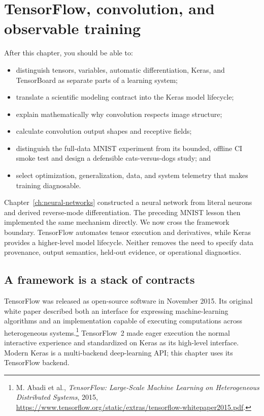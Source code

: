 \chapter{TensorFlow, convolution, and observable training}
\label{ch:tensorflow-convolution}

\begin{learningobjectives}
After this chapter, you should be able to:
\begin{itemize}
  \item distinguish tensors, variables, automatic differentiation, Keras, and
  TensorBoard as separate parts of a learning system;
  \item translate a scientific modeling contract into the Keras model
  lifecycle;
  \item explain mathematically why convolution respects image structure;
  \item calculate convolution output shapes and receptive fields;
  \item distinguish the full-data MNIST experiment from its bounded,
  offline CI smoke test and design a defensible cats-versus-dogs study; and
  \item select optimization, generalization, data, and system telemetry that
  makes training diagnosable.
\end{itemize}
\end{learningobjectives}

\begin{chapterconnection}
Chapter~\ref{ch:neural-networks} constructed a neural network from literal
neurons and derived reverse-mode differentiation. The preceding MNIST lesson
then implemented the same mechanism directly. We now cross the framework
boundary. TensorFlow automates tensor execution and derivatives, while Keras
provides a higher-level model lifecycle. Neither removes the need to specify
data provenance, output semantics, held-out evidence, or operational
diagnostics.
\end{chapterconnection}

\section{A framework is a stack of contracts}

TensorFlow was released as open-source software in November 2015. Its original
white paper described both an interface for expressing machine-learning
algorithms and an implementation capable of executing computations across
heterogeneous systems.\footnote{M. Abadi et al., \emph{TensorFlow: Large-Scale
Machine Learning on Heterogeneous Distributed Systems}, 2015,
\url{https://www.tensorflow.org/static/extras/tensorflow-whitepaper2015.pdf}.}
TensorFlow~2 made eager execution the normal interactive experience and
standardized on Keras as its high-level interface. Modern Keras is a
multi-backend deep-learning API; this chapter uses its TensorFlow backend.


